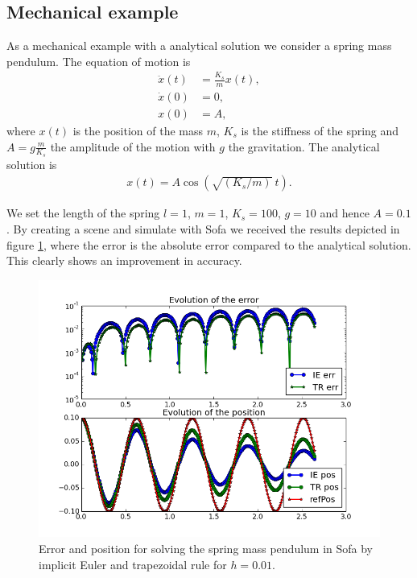 \documentclass[a4paper,11pt]{article}
\begin{document}



\subsection{Mechanical example}
As a mechanical example with a analytical solution we consider a spring mass pendulum.
The equation of motion is
\begin{align*}
\ddot{x}(t) &= \frac{K_s}{m} x(t),\\
\dot{x}(0) &= 0,\\
x(0) &= A,
\end{align*}
where $x(t)$ is the position of the mass $m$, $K_s$ is the stiffness of the spring and $A = g \frac{m}{K_s}$ the amplitude of the motion with $g$ the gravitation.
The analytical solution is
\begin{align*}
x(t) = A \cos(\sqrt{({K_s}/{m})} \ t).
\end{align*}


We set the length of the spring $l=1$, $m=1$, $K_s = 100$, $g=10$ and hence $A = 0.1$.
By creating a scene and simulate with Sofa we received the results depicted in figure \ref{fig1}, where the error is the absolute error compared to the analytical solution. 
This clearly shows an improvement in accuracy. 

\begin{figure}[ht]
\includegraphics[scale= 0.75]{fig_impliciteuler_trapezoidal_dt0_01_spring.png}
\caption{Error and position for solving the spring mass pendulum in Sofa by implicit Euler and trapezoidal rule for $h = 0.01$.}
\label{fig1}
\end{figure}
\end{document}
